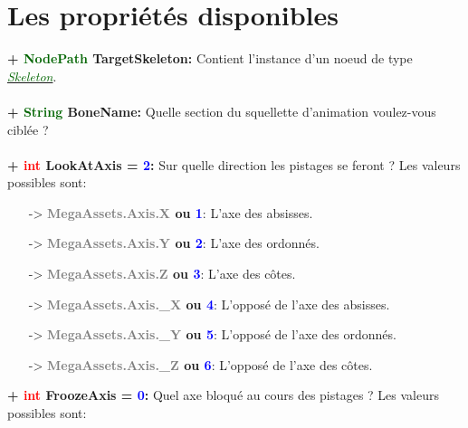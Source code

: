 \documentclass[a4paper, 11pt]{article}
\begin{document}
	\section{Les propriétés disponibles}
	\textbf{+ \textcolor{darkgreen}{NodePath} TargetSkeleton:} Contient l'instance d'un noeud de type
	\href{https://docs.godotengine.org/fr/stable/classes/class_skeleton.html}{\textit{\textcolor{darkgreen}
	{Skeleton}}}.\\\\
	\textbf{+ \textcolor{darkgreen}{String} BoneName:} Quelle section du squellette d'animation voulez-vous 
	ciblée ?\\\\
	\textbf{+ \textcolor{red}{int} LookAtAxis = \textcolor{blue}{2}:} Sur quelle direction les pistages se 
	feront ? Les valeurs possibles sont:
	\begin{itemize}
		\item [-> \textbf{\textcolor{gray}{MegaAssets.Axis.X} ou \textcolor{blue}{1}}:] L'axe des absisses.
		\item [-> \textbf{\textcolor{gray}{MegaAssets.Axis.Y} ou \textcolor{blue}{2}}:] L'axe des ordonnés.
		\item [-> \textbf{\textcolor{gray}{MegaAssets.Axis.Z} ou \textcolor{blue}{3}}:] L'axe des côtes.
		\item [-> \textbf{\textcolor{gray}{MegaAssets.Axis.\_X} ou \textcolor{blue}{4}}:] L'opposé de l'axe 
		des absisses.
		\item [-> \textbf{\textcolor{gray}{MegaAssets.Axis.\_Y} ou \textcolor{blue}{5}}:] L'opposé de l'axe 
		des ordonnés.
		\item [-> \textbf{\textcolor{gray}{MegaAssets.Axis.\_Z} ou \textcolor{blue}{6}}:] L'opposé de l'axe 
		des côtes.\\
	\end{itemize}
	\textbf{+ \textcolor{red}{int} FroozeAxis = \textcolor{blue}{0}:} Quel axe bloqué au cours des pistages 
	? Les valeurs possibles sont:
\end{document}
